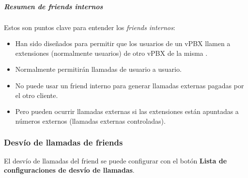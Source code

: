 \documentclass[letterpaper,10pt,spanish]{sphinxmanual}
\begin{document}
\subparagraph{Resumen de friends internos}
\label{administration_portal/client/vpbx/routing_endpoints/friends/internal_friends:summary-of-internal-friends}
Estos son puntos clave para entender los \emph{friends internos}:
\begin{itemize}
\item {} 
Han sido diseñados para permitir que los usuarios de un vPBX llamen a extensiones (normalmente usuarios) de otro vPBX de la misma {\hyperref[administration_portal/brand/settings/corporations:corporations]{}}.

\item {} 
Normalmente permitirán llamadas de usuario a usuario.

\item {} 
No puede usar un friend interno para generar llamadas externas pagadas por el otro cliente.

\item {} 
Pero pueden ocurrir llamadas externas si las extensiones están apuntadas a números externos (llamadas externas controladas).

\end{itemize}


\subsubsection{Desvío de llamadas de friends}
\label{administration_portal/client/vpbx/routing_endpoints/friends/index:friend-call-forward}
El desvío de llamadas del friend se puede configurar con el botón \textbf{Lista de configuraciones de desvío de llamadas}.
\end{document}
